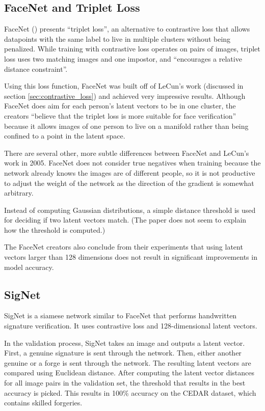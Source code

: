 \subsection{FaceNet and Triplet Loss} %

FaceNet (\cite{triple_loss}) presents ``triplet loss'', an alternative to contrastive loss that allows datapoints with the same label to live in multiple clusters without being penalized.
While training with contrastive loss operates on pairs of images, triplet loss uses two matching images and one impostor, and ``encourages a relative distance constraint''\cite{face_net}.

Using this loss function, FaceNet was built off of LeCun's work (discussed in section \ref{sec:contrastive_loss}) and achieved very impressive results\cite{face_net}.
Although FaceNet does aim for each person's latent vectors to be in one cluster, the creators ``believe that the triplet loss is more suitable for face verification'' because it allows images of one person to live on a manifold rather than being confined to a point in the latent space\cite{face_net}.

There are several other, more subtle differences between FaceNet and LeCun's work in 2005.
FaceNet does not consider true negatives when training because the network already knows the images are of different people, so it is not productive to adjust the weight of the network as the direction of the gradient is somewhat arbitrary.

Instead of computing Gaussian distributions, a simple distance threshold is used for deciding if two latent vectors match.
(The paper does not seem to explain how the threshold is computed.)

The FaceNet creators also conclude from their experiments that using latent vectors larger than 128 dimensions does not result in significant improvements in model accuracy\cite{face_net}.


\subsection{SigNet}\label{sec:sig_net}

SigNet is a siamese network similar to FaceNet that performs handwritten signature verification.
It uses contrastive loss and 128-dimensional latent vectors.

In the validation process, SigNet takes an image and outputs a latent vector.
First, a genuine signature is sent through the network.
Then, either another genuine or a forge is sent through the network.
The resulting latent vectors are compared using Euclidean distance.
After computing the latent vector distances for all image pairs in the validation set, the threshold that results in the best accuracy is picked.
This results in 100\% accuracy on the CEDAR dataset, which contains skilled forgeries.

